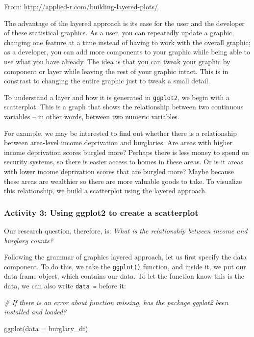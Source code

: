 \documentclass[
]{book}
\newenvironment{Shaded}{\begin{snugshade}}{\end{snugshade}}
\newcommand{\AttributeTok}[1]{\textcolor[rgb]{0.77,0.63,0.00}{#1}}
\newcommand{\CommentTok}[1]{\textcolor[rgb]{0.56,0.35,0.01}{\textit{#1}}}
\newcommand{\FunctionTok}[1]{\textcolor[rgb]{0.00,0.00,0.00}{#1}}
\newcommand{\NormalTok}[1]{#1}
\begin{document}
From: \url{http://applied-r.com/building-layered-plots/}

The advantage of the layered approach is its ease for the user and the developer of these statistical graphics. As a user, you can repeatedly update a graphic, changing one feature at a time instead of having to work with the overall graphic; as a developer, you can add more components to your graphic while being able to use what you have already. The idea is that you can tweak your graphic by component or layer while leaving the rest of your graphic intact. This is in constrast to changing the entire graphic just to tweak a small detail.

To understand a layer and how it is generated in \texttt{ggplot2}, we begin with a scatterplot. This is a graph that shows the relationship between two continuous variables -- in other words, between two numeric variables.

For example, we may be interested to find out whether there is a relationship between area-level income deprivation and burglaries. Are areas with higher income deprivation scores burgled more? Perhaps there is less money to spend on security systems, so there is easier access to homes in these areas. Or is it areas with lower income deprivation scores that are burgled more? Maybe because these areas are wealthier so there are more valuable goods to take. To visualize this relationship, we build a scatterplot using the layered approach.

\hypertarget{activity-3-using-ggplot2-to-create-a-scatterplot}{%
\subsubsection{Activity 3: Using ggplot2 to create a scatterplot}\label{activity-3-using-ggplot2-to-create-a-scatterplot}}

Our research question, therefore, is: \emph{What is the relationship between income and burglary counts?}

Following the grammar of graphics layered approach, let us first specify the data component. To do this, we take the \texttt{ggplot()} function, and inside it, we put our data frame object, which contains our data. To let the function know this is the data, we can also write \texttt{data\ =} before it:

\begin{Shaded}
\begin{Highlighting}[]
\CommentTok{\# If there is an error about function missing, has the package ggplot2 been installed and loaded?}

\FunctionTok{ggplot}\NormalTok{(}\AttributeTok{data =}\NormalTok{ burglary\_df)}
\end{Highlighting}
\end{Shaded}
\end{document}
